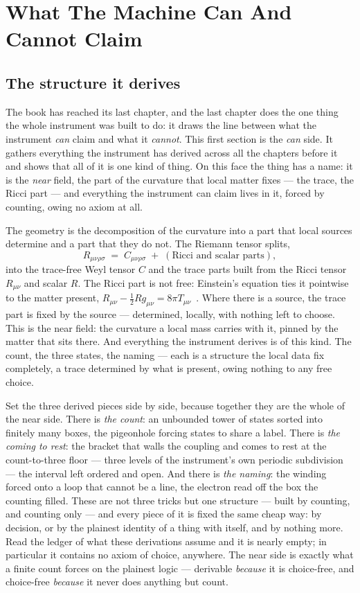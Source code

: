 \chapter{What The Machine Can And Cannot Claim}

\section{The structure it derives}

The book has reached its last chapter, and the last chapter does the one thing the whole instrument was built to do: it draws
the line between what the instrument \emph{can} claim and what it \emph{cannot}. This first section is the \emph{can} side. It
gathers everything the instrument has derived across all the chapters before it and shows that all of it is one kind of thing.
On this face the thing has a name: it is the \emph{near} field, the part of the curvature that local matter fixes --- the
trace, the Ricci part --- and everything the instrument can claim lives in it, forced by counting, owing no axiom at all.

The geometry is the decomposition of the curvature into a part that local sources determine and a part that they do not. The
Riemann tensor splits,
\[
  R_{\mu\nu\rho\sigma} \;=\; C_{\mu\nu\rho\sigma} \;+\; (\text{Ricci and scalar parts}) ,
\]
into the trace-free Weyl tensor $C$ and the trace parts built from the Ricci tensor $R_{\mu\nu}$ and scalar $R$. The Ricci
part is not free: Einstein's equation ties it pointwise to the matter present, $R_{\mu\nu} - \tfrac12 R g_{\mu\nu} = 8\pi
T_{\mu\nu}$~\cite{einstein1915,einstein1916}. Where there is a source, the trace part is fixed by the source --- determined,
locally, with nothing left to choose. This is the near field: the curvature a local mass carries with it, pinned by the
matter that sits there. And everything the instrument derives is of this kind. The count, the three states, the naming --- each
is a structure the local data fix completely, a trace determined by what is present, owing nothing to any free choice.

Set the three derived pieces side by side, because together they are the whole of the near side. There is \emph{the count}:
an unbounded tower of states sorted into finitely many boxes, the pigeonhole forcing states to share a label. There is
\emph{the coming to rest}: the bracket that walls the coupling and comes to rest at the count-to-three floor --- three levels of the
instrument's own periodic subdivision --- the interval left ordered and open. And there is \emph{the naming}: the winding forced onto a loop that
cannot be a line, the electron read off the box the counting filled. These are not three tricks but one structure --- built by
counting, and counting only --- and every piece of it is fixed the same cheap way: by decision, or by the plainest identity of
a thing with itself, and by nothing more. Read the ledger of what these derivations assume and it is nearly empty; in
particular it contains no axiom of choice, anywhere. The near side is exactly what a finite count forces on the plainest
logic --- derivable \emph{because} it is choice-free, and choice-free \emph{because} it never does anything but count.

